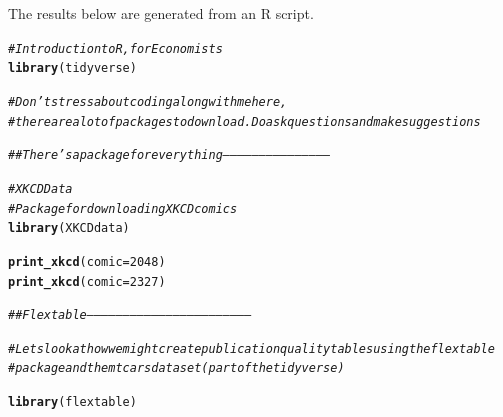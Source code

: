 \documentclass{article}\usepackage[]{graphicx}\usepackage[]{xcolor}
\makeatletter
\newcommand{\hlnum}[1]{\textcolor[rgb]{0.686,0.059,0.569}{#1}}%
\newcommand{\hlcom}[1]{\textcolor[rgb]{0.678,0.584,0.686}{\textit{#1}}}%
\newcommand{\hlstd}[1]{\textcolor[rgb]{0.345,0.345,0.345}{#1}}%
\newcommand{\hlkwc}[1]{\textcolor[rgb]{0.333,0.667,0.333}{#1}}%
\newcommand{\hlkwd}[1]{\textcolor[rgb]{0.737,0.353,0.396}{\textbf{#1}}}%
\newenvironment{kframe}{%
 \def\at@end@of@kframe{}%
 \ifinner\ifhmode%
  \def\at@end@of@kframe{\end{minipage}}%
  \begin{minipage}{\columnwidth}%
 \fi\fi%
 \def\FrameCommand##1{\hskip\@totalleftmargin \hskip-\fboxsep
 \colorbox{shadecolor}{##1}\hskip-\fboxsep
     \hskip-\linewidth \hskip-\@totalleftmargin \hskip\columnwidth}%
 \MakeFramed {\advance\hsize-\width
   \@totalleftmargin\z@ \linewidth\hsize
   \@setminipage}}%
 {\par\unskip\endMakeFramed%
 \at@end@of@kframe}
\newenvironment{knitrout}{}{} %
\makeatother
\begin{document}
\title{\title{\title{\title{\title{\title{}}}}}}



\maketitle
The results below are generated from an R script.

\begin{knitrout}
\color{fgcolor}\begin{kframe}
\begin{alltt}
\hlcom{# Introduction to R, for Economists}
\hlkwd{library}\hlstd{(tidyverse)}

\hlcom{# Don't stress about coding along  with me here, }
\hlcom{#   there are a lot of packages to download. Do ask questions and make suggestions}

\hlcom{## There's a package for everything---------------------------------------------}

\hlcom{# XKCD Data }
\hlcom{# Package for downloading XKCD comics}
\hlkwd{library}\hlstd{(XKCDdata)}

\hlkwd{print_xkcd}\hlstd{(}\hlkwc{comic} \hlstd{=} \hlnum{2048}\hlstd{)}
\hlkwd{print_xkcd}\hlstd{(}\hlkwc{comic} \hlstd{=} \hlnum{2327}\hlstd{)}

\hlcom{## Flextable--------------------------------------------------------------------}

\hlcom{# Lets look at how we might create publication quality tables using the flextable}
\hlcom{# package and the mtcars dataset (part of the tidyverse) }

\hlkwd{library}\hlstd{(flextable)}


\end{alltt}
\end{kframe}
\end{knitrout}
\end{document}
